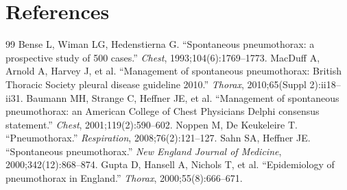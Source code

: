 \section*{References}
\begin{thebibliography}{99}
 Bense L, Wiman LG, Hedenstierna G. ``Spontaneous pneumothorax: a prospective study of 500 cases.'' \textit{Chest}, 1993;104(6):1769--1773.
 MacDuff A, Arnold A, Harvey J, et al. ``Management of spontaneous pneumothorax: British Thoracic Society pleural disease guideline 2010.'' \textit{Thorax}, 2010;65(Suppl 2):ii18--ii31.
 Baumann MH, Strange C, Heffner JE, et al. ``Management of spontaneous pneumothorax: an American College of Chest Physicians Delphi consensus statement.'' \textit{Chest}, 2001;119(2):590--602.
 Noppen M, De Keukeleire T. ``Pneumothorax.'' \textit{Respiration}, 2008;76(2):121--127.
 Sahn SA, Heffner JE. ``Spontaneous pneumothorax.'' \textit{New England Journal of Medicine}, 2000;342(12):868--874.
 Gupta D, Hansell A, Nichols T, et al. ``Epidemiology of pneumothorax in England.'' \textit{Thorax}, 2000;55(8):666--671.

\end{thebibliography}
